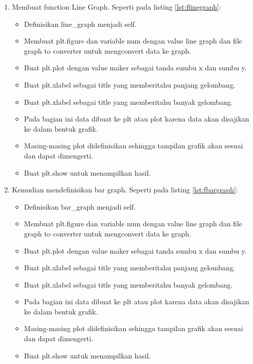 \begin{enumerate}
\item Membuat function Line Graph.
Seperti pada listing \ref{lst:flinegraph}:

\begin{itemize}
\item Definisikan line\_graph menjadi self.
\item Membuat plt.figure dan variable num dengan value line graph dan file graph to converter untuk mengconvert data ke graph.
\item Buat plt.plot dengan value maker sebagai tanda sumbu x dan sumbu y.
\item Buat plt.xlabel sebagai title yang memberitahu panjang gelombang.
\item Buat plt.xlabel sebagai title yang memberitahu banyak gelombang.
\item Pada bagian ini data dibuat ke plt atau plot karena data akan disajikan ke dalam bentuk grafik.
\item Masing-masing plot didefinisikan sehingga tampilan grafik akan sesuai dan dapat dimengerti.
\item Buat plt.show untuk menampilkan hasil.
\end{itemize}

\item Kemudian mendefinisikan bar graph.
Seperti pada listing \ref{lst:fbargraph}:

\begin{itemize}
\item Definisikan bar\_graph menjadi self.
\item Membuat plt.figure dan variable num dengan value line graph dan file graph to converter untuk mengconvert data ke graph.
\item Buat plt.plot dengan value maker sebagai tanda sumbu x dan sumbu y.
\item Buat plt.xlabel sebagai title yang memberitahu panjang gelombang.
\item Buat plt.xlabel sebagai title yang memberitahu banyak gelombang.
\item Pada bagian ini data dibuat ke plt atau plot karena data akan disajikan ke dalam bentuk grafik.
\item Masing-masing plot didefinisikan sehingga tampilan grafik akan sesuai dan dapat dimengerti.
\item Buat plt.show untuk menampilkan hasil.
\end{itemize}
\end{enumerate}


